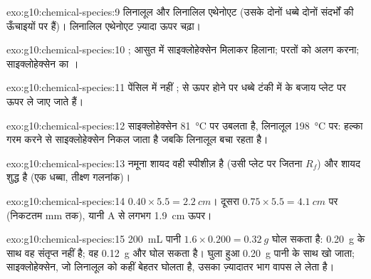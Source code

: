 \begin{solution}{exo:g10:chemical-species:9}
लिनालूल और लिनालिल एथेनोएट (उसके दोनों धब्बे दोनों संदर्भों की ऊँचाइयों
पर हैं)। लिनालिल एथेनोएट ज़्यादा ऊपर चढ़ा।
\end{solution}

\begin{solution}{exo:g10:chemical-species:10}
; आसुत में साइक्लोहेक्सेन मिलाकर हिलाना;
परतों को अलग करना; साइक्लोहेक्सेन का ।
\end{solution}

\begin{solution}{exo:g10:chemical-species:11}
पेंसिल  में नहीं ;  से ऊपर होने पर धब्बे टंकी में  के
बजाय प्लेट पर ऊपर ले जाए जाते हैं।
\end{solution}

\begin{solution}{exo:g10:chemical-species:12}
साइक्लोहेक्सेन \qty{81}{\celsius} पर उबलता है, लिनालूल \qty{198}{\celsius} पर:
हल्का गरम करने से साइक्लोहेक्सेन निकल जाता है जबकि लिनालूल बचा रहता है।
\end{solution}

\begin{solution}{exo:g10:chemical-species:13}
नमूना शायद वही स्पीशीज़ है (उसी प्लेट पर  जितना $R_f$) और शायद
शुद्ध है (एक धब्बा, तीक्ष्ण गलनांक)।
\end{solution}

\begin{solution}{exo:g10:chemical-species:14}
$0.40 \times 5.5 = \qty{2.2}{cm}$। दूसरा $0.75 \times 5.5 =
\qty{4.1}{cm}$ पर (निकटतम mm तक), यानी A से लगभग \qty{1.9}{cm} ऊपर।
\end{solution}

\begin{solution}{exo:g10:chemical-species:15}
\qty{200}{mL} पानी $1.6 \times 0.200 = \qty{0.32}{g}$ घोल सकता है:
\qty{0.20}{g} के साथ वह संतृप्त नहीं है; वह \qty{0.12}{g} और घोल सकता है।
घुला हुआ \qty{0.20}{g} पानी के साथ खो जाता; साइक्लोहेक्सेन,
जो लिनालूल को कहीं बेहतर घोलता है, उसका ज़्यादातर भाग वापस ले लेता है।
\end{solution}

